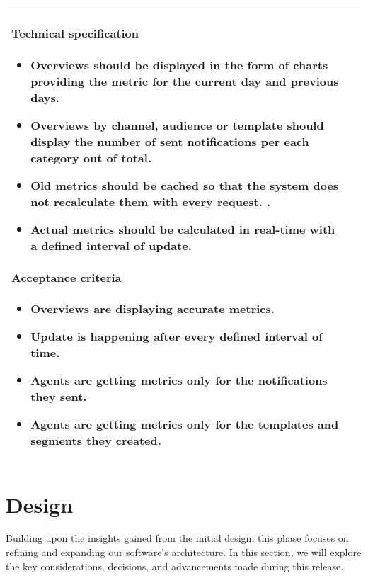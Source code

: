 \begin{longtable}{ | m{} | m{} | }
    \paragraph*{Technical specification} \mbox{} \newline
    \begin{itemize}
        \item Overviews should be displayed in the form of charts providing the metric for the current day and previous days.
        \item Overviews by channel, audience or template should display the number of sent notifications per each category
              out of total.
        \item Old metrics should be cached so that the system does not recalculate them with every request.        .
        \item Actual metrics should be calculated in real-time with a defined interval of update.
    \end{itemize}
    \paragraph*{Acceptance criteria} \mbox{} \newline
    \begin{itemize}
        \item Overviews are displaying accurate metrics.
        \item Update is happening after every defined interval of time.
        \item Agents are getting metrics only for the notifications they sent.
        \item Agents are getting metrics only for the templates and segments they created.
    \end{itemize}                                                                                                                                                            \\
    \hline
\end{longtable}

\section{Design}
Building upon the insights gained from the initial design, this phase focuses on refining and expanding our
software's architecture. In this section, we will explore the key considerations, decisions, and advancements
made during this release.

